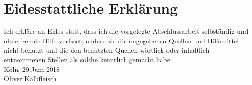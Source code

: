 \chapter*{Eidesstattliche Erklärung}

Ich erkläre an Eides statt, dass ich die vorgelegte Abschlussarbeit selbständig und ohne fremde Hilfe verfasst, andere als die angegebenen Quellen und Hilfsmittel nicht benutzt und die den benutzten Quellen wörtlich oder inhaltlich entnommenen Stellen als solche kenntlich gemacht habe.
\vspace{1.5cm}
\\
Köln, 29.Juni 2018
\vspace{3cm}
\\
Oliver Kalbfleisch


